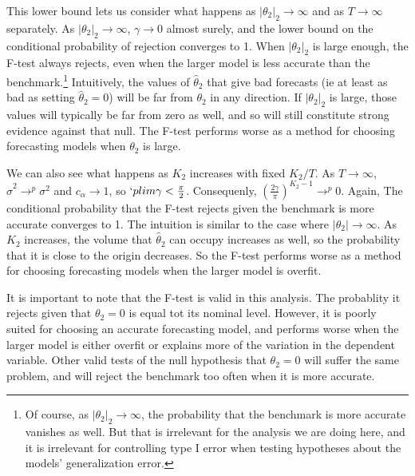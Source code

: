 \documentclass[11pt]{article}
\newcommand{\plim}{`plim}
\begin{document}
This lower bound lets us consider what happens as $|\theta_2|_2 \to
\infty$ and as $T \to \infty$ separately.  As $|\theta_2|_2 \to
\infty$, $\gamma\to0$ almost surely, and the lower bound on the
conditional probability of rejection converges to 1.  When
$|\theta_2|_2$ is large enough, the F-test always rejects, even when
the larger model is less accurate than the benchmark.\footnote{Of
  course, as $|\theta_2|_2 \to \infty$, the probability that the
  benchmark is more accurate vanishes as well.  But that is irrelevant
  for the analysis we are doing here, and it is irrelevant for
  controlling type I error when testing hypotheses about the models'
  generalization error.}  Intuitively, the values of $\hat{\theta}_2$
that give bad forecasts (ie at least as bad as setting
$\hat{\theta}_2=0$) will be far from $\theta_2$ in any direction.  If
$|\theta_2|_2$ is large, those values will typically be far from zero
as well, and so will still constitute strong evidence against that
null.  The F-test performs worse as a method for choosing forecasting
models when $\theta_2$ is large.

We can also see what happens as $K_2$ increases with fixed $K_2/T$.  As
$T\to\infty$, $\hat{\sigma}^2\to^p\sigma^2$ and $c_{\alpha}\to 1$, so
$\plim \gamma < \frac{\pi}{2}$.  Consequenly,
$(\frac{2\gamma}{\pi})^{K_2-1}\to^p0$.  Again, The conditional
probability that the F-test rejects given the benchmark is more
accurate converges to 1.  The intuition is similar to the case where
$|\theta_2|\to\infty$.  As $K_2$ increases, the volume that
$\hat{\theta}_2$ can occupy increases as well, so the probability that
it is close to the origin decreases.  So the F-test performs worse as
a method for choosing forecasting models when the larger model is
overfit. 

It is important to note that the F-test is valid in this analysis.
The probablity it rejects given that $\theta_2 = 0$ is equal tot its
nominal level.  However, it is poorly suited for choosing an accurate
forecasting model, and performs worse when the larger model is either
overfit or explains more of the variation in the dependent variable.
Other valid tests of the null hypothesis that $\theta_2 = 0$ will
suffer the same problem, and will reject the benchmark too often when
it is more accurate.
\end{document}
